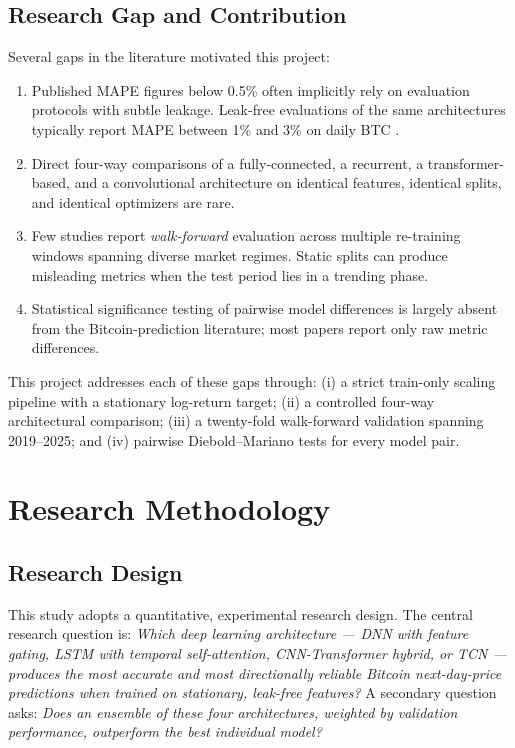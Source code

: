\documentclass[12pt]{article}
\begin{document}
\subsection{Research Gap and Contribution}

Several gaps in the literature motivated this project:
\begin{enumerate}[leftmargin=*]
    \item Published MAPE figures below 0.5\% often implicitly rely on evaluation protocols with subtle leakage. Leak-free evaluations of the same architectures typically report MAPE between 1\% and 3\% on daily BTC \cite{hamayel2021,seabe2023}.
    \item Direct four-way comparisons of a fully-connected, a recurrent, a transformer-based, and a convolutional architecture on identical features, identical splits, and identical optimizers are rare.
    \item Few studies report \emph{walk-forward} evaluation across multiple re-training windows spanning diverse market regimes. Static splits can produce misleading metrics when the test period lies in a trending phase.
    \item Statistical significance testing of pairwise model differences is largely absent from the Bitcoin-prediction literature; most papers report only raw metric differences.
\end{enumerate}

This project addresses each of these gaps through: (i) a strict train-only scaling pipeline with a stationary log-return target; (ii) a controlled four-way architectural comparison; (iii) a twenty-fold walk-forward validation spanning 2019--2025; and (iv) pairwise Diebold--Mariano tests for every model pair.

\section{Research Methodology}
\label{sec:methodology}

\subsection{Research Design}

This study adopts a quantitative, experimental research design. The central research question is: \textit{Which deep learning architecture --- DNN with feature gating, LSTM with temporal self-attention, CNN-Transformer hybrid, or TCN --- produces the most accurate and most directionally reliable Bitcoin next-day-price predictions when trained on stationary, leak-free features?} A secondary question asks: \textit{Does an ensemble of these four architectures, weighted by validation performance, outperform the best individual model?}
\end{document}

